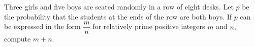 Three girls and five boys are seated randomly in a row of eight desks. Let $p$ be the probability that the students at the ends of the row are both boys. If $p$ can be expressed in the form $\dfrac{m}{n}$ for relatively prime positive integers $m$ and $n$, compute $m + n$.
